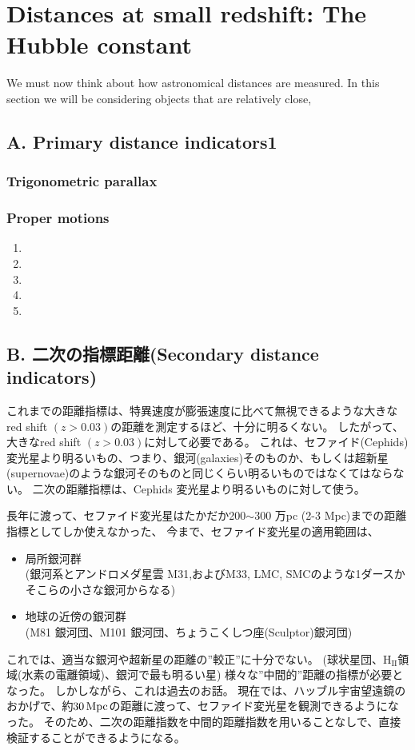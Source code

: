 \documentclass[11pt]{ltjsarticle}
\theoremstyle{plain}
\theoremstyle{break}
\begin{document}
\section{Distances at small redshift: The Hubble constant}
\label{sec:1.3.Distances-at-small-redshift:}

We must now think about how astronomical distances are measured.
In this section we will be considering objects that are relatively close,


\subsection{A. Primary distance indicators1}
\subsubsection{Trigonometric parallax}
\subsubsection{Proper motions}
\begin{enumerate}
  \item
  \item
  \item
  \item
  \item
\end{enumerate}
\newpage
\subsection*{B. 二次の指標距離(Secondary distance indicators)}
これまでの距離指標は、特異速度が膨張速度に比べて無視できるような大きなred shift $(z> 0.03)$の距離を測定するほど、十分に明るくない。
したがって、大きなred shift $(z> 0.03)$に対して必要である。
これは、セファイド(Cephids)変光星より明るいもの、つまり、銀河(galaxies)そのものか、もしくは超新星(supernovae)のような銀河そのものと同じくらい明るいものではなくてはならない。
  二次の距離指標は、Cephids 変光星より明るいものに対して使う。

長年に渡って、セファイド変光星はたかだか200$\sim$300 万pc (2-3 Mpc)までの距離指標としてしか使えなかった、
今まで、セファイド変光星の適用範囲は、
\begin{itemize}
  \item 局所銀河群\\
        (銀河系とアンドロメダ星雲 M31,およびM33, LMC, SMCのような1ダースかそこらの小さな銀河からなる)
  \item 地球の近傍の銀河群\\
        (M81 銀河団、M101 銀河団、ちょうこくしつ座(Sculptor)銀河団)
\end{itemize}
これでは、適当な銀河や超新星の距離の”較正”に十分でない。
(球状星団、$\mathrm{H_{II}}$領域(水素の電離領域)、銀河で最も明るい星)
様々な”中間的”距離の指標が必要となった。
しかしながら、これは過去のお話。
現在では、ハッブル宇宙望遠鏡のおかげで、約$30\,\rm{Mpc}$の距離に渡って、セファイド変光星を観測できるようになった。
そのため、二次の距離指数を中間的距離指数を用いることなしで、直接検証することができるようになる。
\end{document}
